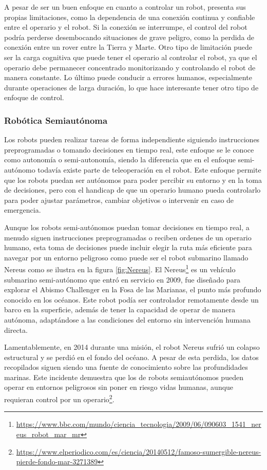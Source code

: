 A pesar de ser un buen enfoque en cuanto a controlar un robot, presenta sus propias limitaciones, como la dependencia de una conexión continua y confiable entre
el operario y el robot. Si la conexión se interrumpe, el control del robot podría perderse desembocando situaciones de grave peligro, como la perdida de conexión entre un rover entre 
la Tierra y Marte. Otro tipo de limitación puede ser la carga
cognitiva que puede tener el operario al controlar el robot, ya que el operario debe permanecer concentrado monitorizando y controlando el robot de manera constante.
Lo último puede conducir a errores humanos, especialmente durante operaciones de larga duración, lo que hace interesante tener otro tipo de enfoque de control.

\subsubsection{Robótica Semiautónoma}
\label{sec:subseccion}
Los robots pueden realizar tareas de forma independiente siguiendo instrucciones preprogramadas o tomando decisiones en tiempo real, este enfoque se le conoce como autonomía o semi-autonomía, 
siendo la diferencia que en el enfoque semi-autónomo todavía existe parte de teleoperación en el robot. Este enfoque permite que los robots puedan ser autónomos para poder
percibir su entorno y en la toma de decisiones, pero con el handicap de que un operario humano pueda controlarlo para poder ajustar parámetros, cambiar objetivos o intervenir 
en caso de emergencia. 

Aunque los robots semi-autónomos puedan tomar decisiones en tiempo real, a menudo siguen instrucciones preprogramadas o reciben ordenes de un operario humano, esta toma de decisiones
puede incluir elegir la ruta más eficiente para navegar por un entorno peligroso como puede ser el robot submarino llamado Nereus como se ilustra en la figura \ref{fig:Nereus}. 
El Nereus\footnote{\url{https://www.bbc.com/mundo/ciencia_tecnologia/2009/06/090603_1541_nereus_robot_mar_mr}} 
es un vehículo submarino semi-autónomo que entró en servicio en 2009, fue diseñado para explorar el Abismo Challenger en la Fosa de las Marianas, el punto más profundo conocido en los 
océanos. Este robot podía ser controlador remotamente desde un barco en la superficie, además de tener la capacidad de operar de manera autónoma, adaptándose a las condiciones del entorno
sin intervención humana directa.

Lamentablemente, en 2014 durante una misión, el robot Nereus sufrió un colapso estructural y se perdió en el fondo del océano. A pesar de esta perdida, los datos recopilados
siguen siendo una fuente de conocimiento sobre las profundidades marinas. Este incidente demuestra que los de robots semiautónomos pueden operar en entornos peligrosos sin poner 
en riesgo vidas humanas, aunque requieran control por un operario\footnote{\url{https://www.elperiodico.com/es/ciencia/20140512/famoso-sumergible-nereus-pierde-fondo-mar-3271389}}. 

